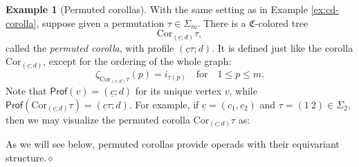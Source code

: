 \documentclass[11pt]{amsbook}
\numberwithin{section}{chapter}
\numberwithin{subsection}{section}
\numberwithin{equation}{section}
\theoremstyle{plain}
\theoremstyle{definition}
\newtheorem{example}[equation]{Example}
\newcommand{\colorc}{\mathfrak{C}}
\newcommand{\Cor}{\mathrm{Cor}}
\newcommand{\Prof}{\mathsf{Prof}}
\newcommand{\profofv}{\Prof(v)}
\newcommand{\dqed}{\hfill$\diamond$}
\newcommand{\uc}{\underline c}
\newcommand{\forspace}{\quad\text{for}\quad}
\begin{document}
\begin{example}[Permuted corollas]\label{ex:cd-permuted-corolla}
With the same setting as in Example \ref{ex:cd-corolla}, suppose given a permutation $\tau \in \Sigma_m$.  There is a $\colorc$-colored tree \[\Cor_{(\uc;d)}\tau,\] called the \emph{permuted corolla}\label{notation:permuted-corolla}, with profile $(\uc\tau;d)$.  It is defined just like the corolla $\Cor_{(\uc;d)}$, except for the ordering of the whole graph:
\[\zeta_{\Cor_{(\uc;d)}\tau}(p) = i_{\tau(p)} \forspace 1 \leq p \leq m.\]
Note that $\profofv = (\uc;d)$ for its unique vertex $v$, while $\Prof(\Cor_{(\uc;d)}\tau)=(\uc\tau;d)$.  For example, if $\uc = (c_1,c_2)$ and $\tau = (1~2) \in \Sigma_2$, then we may visualize the permuted corolla $\Cor_{(\uc;d)}\tau$ as:
\begin{center}\end{center}
As we will see below, permuted corollas provide operads with their equivariant structure.\dqed \end{example}
\end{document}
